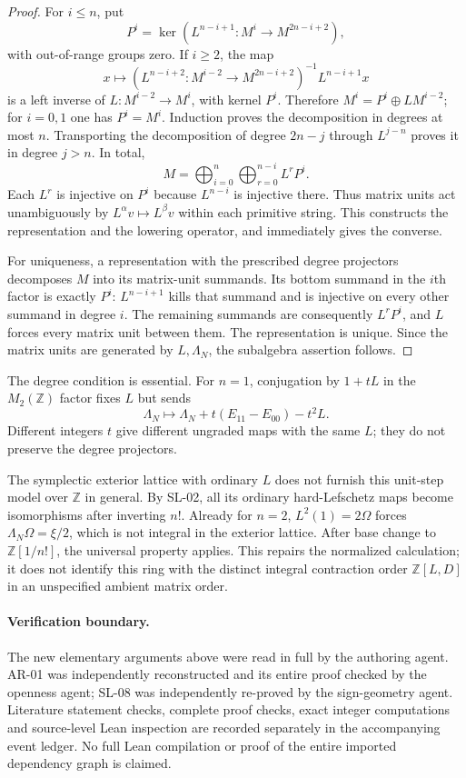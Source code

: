 \documentclass[11pt,a4paper]{article}
\theoremstyle{remark}
\begin{document}
\begin{proof}
For $i\le n$, put
\[
 P^i=\ker(L^{n-i+1}:M^i\to M^{2n-i+2}),
\]
with out-of-range groups zero.  If $i\ge2$, the map
\[
 x\longmapsto
 (L^{n-i+2}:M^{i-2}\to M^{2n-i+2})^{-1}L^{n-i+1}x
\]
is a left inverse of $L:M^{i-2}\to M^i$, with kernel $P^i$.
Therefore $M^i=P^i\oplus LM^{i-2}$; for $i=0,1$ one has $P^i=M^i$.
Induction proves the decomposition in degrees at most $n$.  Transporting
the decomposition of degree $2n-j$ through $L^{j-n}$ proves it in degree
$j>n$.  In total,
\[
 M=\bigoplus_{i=0}^n\bigoplus_{r=0}^{n-i}L^rP^i.
\]
Each $L^r$ is injective on $P^i$ because $L^{n-i}$ is injective there.
Thus matrix units act unambiguously by $L^\alpha v\mapsto L^\beta v$
within each primitive string.  This constructs the representation and
the lowering operator, and immediately gives the converse.

For uniqueness, a representation with the prescribed degree projectors
decomposes $M$ into its matrix-unit summands.  Its bottom summand in the
$i$th factor is exactly $P^i$: $L^{n-i+1}$ kills that summand and is
injective on every other summand in degree $i$.  The remaining summands
are consequently $L^rP^i$, and $L$ forces every matrix unit between them.
The representation is unique.  Since the matrix units are generated by
$L,\Lambda_N$, the subalgebra assertion follows.
\end{proof}

The degree condition is essential.  For $n=1$, conjugation by $1+tL$ in
the $M_2(\mathbb Z)$ factor fixes $L$ but sends
\[
 \Lambda_N\longmapsto
 \Lambda_N+t(E_{11}-E_{00})-t^2L.
\]
Different integers $t$ give different ungraded maps with the same $L$;
they do not preserve the degree projectors.

The symplectic exterior lattice with ordinary $L$ does not furnish this
unit-step model over $\mathbb Z$ in general.  By SL-02, all its ordinary
hard-Lefschetz maps become isomorphisms after inverting $n!$.  Already for
$n=2$, $L^2(1)=2\Omega$ forces $\Lambda_N\Omega=\xi/2$, which is not
integral in the exterior lattice.  After base change to
$\mathbb Z[1/n!]$, the universal property applies.  This repairs the
normalized calculation; it does not identify this ring with the distinct
integral contraction order $\mathbb Z[L,D]$ in an unspecified ambient
matrix order.

\paragraph{Verification boundary.}
The new elementary arguments above were read in full by the authoring
agent.  AR-01 was independently reconstructed and its entire proof checked
by the openness agent; SL-08 was independently re-proved by the sign-geometry
agent.  Literature statement checks, complete proof checks, exact integer
computations and source-level Lean inspection are recorded separately in
the accompanying event ledger.  No full Lean compilation or proof of the
entire imported dependency graph is claimed.
\end{document}
